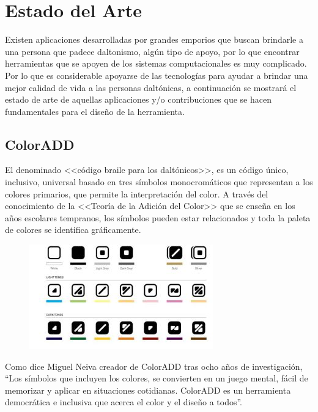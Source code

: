 \documentclass[10pt]{article}
\begin{document}
\cite{IEEEreferencias:Ref2}

\section{Estado del Arte}
Existen aplicaciones desarrolladas por grandes emporios que buscan brindarle a una persona que padece daltonismo, algún tipo de apoyo, por lo que encontrar herramientas que se apoyen de los sistemas computacionales es muy complicado. Por lo que es considerable apoyarse de las tecnologías para ayudar a brindar una mejor calidad de vida a las personas daltónicas, a continuación se mostrará el estado de arte de aquellas aplicaciones y/o contribuciones que se hacen fundamentales para el diseño de la herramienta.

\subsection{ColorADD}

El denominado <<código braile para los daltónicos>>, es un código único, inclusivo, universal basado en tres símbolos monocromáticos que representan a los colores primarios, que permite la interpretación del color. A través del conocimiento de la <<Teoría de la Adición del Color>> que se enseña en los años escolares tempranos, los símbolos pueden estar relacionados y toda la paleta de colores se identifica gráficamente.\cite{IEEEreferencias:Ref2}
\newline
\begin{figure}[H]
	\begin{center}
\includegraphics[scale = 0.85]{Imagenes/1437744306_549219_1437997332_sumario_normal.jpg}
	\end{center} 
\end{figure}

Como dice Miguel Neiva creador de ColorADD tras ocho años de investigación, “Los símbolos que incluyen los colores, se convierten en un juego mental, fácil de memorizar y aplicar en situaciones cotidianas. ColorADD es un herramienta democrática e inclusiva que acerca el color y el diseño a todos”.
\cite{IEEEreferencias:Ref2} \newline
\end{document}

